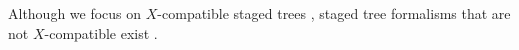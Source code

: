 \documentclass[preprint,12pt]{elsarticle}
\newtheorem{mydef}{Definition}
\begin{document}
Although we focus on $X$-compatible staged trees \citep[both because they are widely used and because efficient learning procedures are available,][]{JSSv102i06}, staged tree formalisms that are not $X$-compatible exist \cite{leonelli2019,carter2024pgm}.

\end{document}
